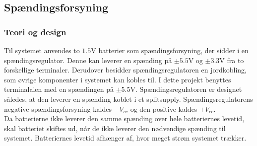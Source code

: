 \subsection{Spændingsforsyning}
\subsubsection{Teori og design}
Til systemet anvendes to $1.5$V batterier som spændingsforsyning, der sidder i en spændingsregulator. Denne kan leverer en spænding på $\pm5.5$V og $\pm3.3$V fra to forskellige terminaler. Derudover besidder spændingsregulatoren en jordkobling, som øvrige komponenter i systemet kan kobles til. I dette projekt benyttes terminalalen med en spændingen på $\pm5.5$V. Spændingsregulatoren er designet således, at den leverer en spænding koblet i et splitsupply. Spændingsregulatorens negative spændingsforsyning kaldes $-V_{cc}$ og den positive kaldes $+V_{cc}$. \\%
Da batterierne ikke leverer den samme spænding over hele batteriernes levetid, skal batteriet skiftes ud, når de ikke leverer den nødvendige spænding til systemet. Batteriernes levetid afhænger af, hvor meget strøm systemet trækker. %

